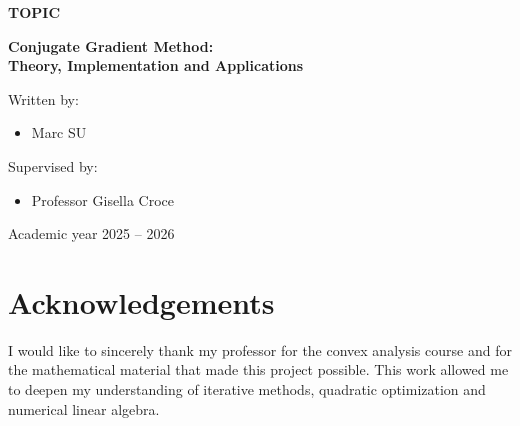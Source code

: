 \documentclass[11pt,a4paper]{report}
\theoremstyle{definition}
\theoremstyle{plain}
\theoremstyle{remark}
\begin{document}
\begin{titlepage}
\vspace{1.9cm}

{\Large\bfseries\color{or} TOPIC\par}

\vspace{0.4cm}

{\Huge\bfseries\color{bleufonce}
Conjugate Gradient Method:\\[0.2cm]
Theory, Implementation and Applications
\par}

\vfill

\vspace{-1.5cm}

\noindent
\begin{minipage}[t]{0.45\textwidth}
\raggedright
{\large Written by:\par}
\vspace{0.35cm}
\begin{itemize}
    \item Marc SU
\end{itemize}
\end{minipage}
\hfill
\begin{minipage}[t]{0.45\textwidth}
\raggedright
{\large Supervised by:\par}
\vspace{0.35cm}
\begin{itemize}
    \item Professor Gisella Croce
\end{itemize}
\end{minipage}

\vspace{1.5cm}

{\large Academic year 2025 -- 2026\par}

\end{titlepage}

\section*{Acknowledgements}

I would like to sincerely thank my professor for the convex analysis course and for the mathematical material that made this project possible. This work allowed me to deepen my understanding of iterative methods, quadratic optimization and numerical linear algebra.
\end{document}

